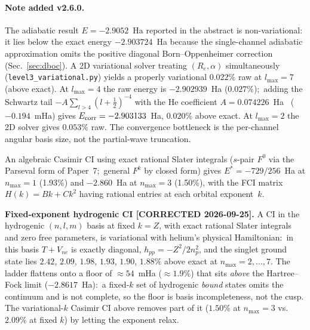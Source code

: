 \documentclass[aps,pra,twocolumn,superscriptaddress,longbibliography]{revtex4-2}
\begin{document}
\paragraph{Note added v2.6.0.}
The adiabatic result $E = -2.9052$~Ha reported in the abstract is
non-variational: it lies below the exact energy $-2.903724$~Ha
because the single-channel adiabatic approximation omits the positive
diagonal Born--Oppenheimer correction (Sec.~\ref{sec:dboc}).  A 2D
variational solver treating
$(R_e, \alpha)$ simultaneously (\texttt{level3\_variational.py})
yields a properly variational $0.022\%$ raw at $l_{\max} = 7$
(above exact).  At $l_{\max} = 4$ the raw energy is
$-2.902939$~Ha ($0.027\%$);\ adding the Schwartz tail
$-A\sum_{l>4}(l+\tfrac12)^{-4}$ with the He coefficient
$A = 0.074226$~Ha~\cite{BromleyMitroy2006} ($-0.194$~mHa) gives
$E_{\rm corr} = -2.903133$~Ha, $0.020\%$ above exact.  At
$l_{\max} = 2$ the 2D solver gives $0.053\%$ raw.  The
convergence bottleneck is the per-channel angular basis size, not the
partial-wave truncation.

An algebraic Casimir CI using exact rational Slater integrals ($s$-pair
$F^0$ via the Parseval form of Paper~7;\ general $F^k$ by closed form) gives $E^* = -729/256$~Ha
at $n_{\max} = 1$ (1.93\%) and $-2.860$~Ha at $n_{\max} = 3$
(1.50\%), with the FCI matrix $H(k) = Bk + Ck^2$ having rational
entries at each orbital exponent~$k$.

\textbf{Fixed-exponent hydrogenic CI [CORRECTED 2026-09-25].}
A CI in the hydrogenic $(n,l,m)$ basis at fixed $k = Z$, with exact
rational Slater integrals and zero free parameters, is variational
with helium's physical Hamiltonian:\ in this basis $T + V_{ne}$ is
exactly diagonal, $h_{pp} = -Z^2/2n_p^2$, and the singlet ground
state lies $2.42$, $2.09$, $1.98$, $1.93$, $1.90$, $1.88\%$ above exact at $n_{\max} = 2,\dots,7$.  The ladder
flattens onto a floor of $\approx\!54$~mHa ($\approx\!1.9\%$) that sits
\emph{above} the Hartree--Fock limit ($-2.8617$~Ha):\ a fixed-$k$ set of
hydrogenic \emph{bound} states omits the continuum and is not complete,
so the floor is basis incompleteness, not the cusp.  The
variational-$k$ Casimir CI above removes part of it ($1.50\%$ at
$n_{\max}=3$ vs.\ $2.09\%$ at fixed $k$) by letting the
exponent relax.
\end{document}
